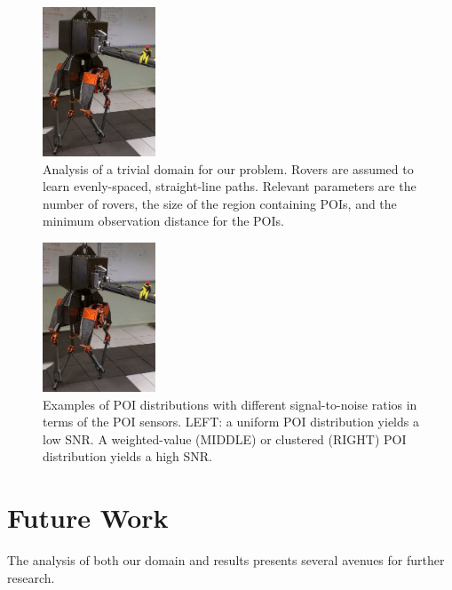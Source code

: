 \documentclass[letterpaper, 10 pt, conference]{ieeeconf}  %
\begin{document}
\begin{figure}[h!]
    \centering
    \includegraphics[width=0.3\textwidth]{ATRIAS.jpg}
    \caption{Analysis of a trivial domain for our problem. Rovers are assumed to learn evenly-spaced, straight-line paths. Relevant parameters are the number of rovers, the size of the region containing POIs, and the minimum observation distance for the POIs. }
    \label{fig:triviality}
\end{figure}

\begin{figure}[h!]
    \centering
    \includegraphics[width=0.3\textwidth]{ATRIAS.jpg}
    \caption{Examples of POI distributions with different signal-to-noise ratios in terms of the POI sensors. LEFT: a uniform POI distribution yields a low SNR. A weighted-value (MIDDLE) or clustered (RIGHT) POI distribution yields a high SNR. }
    \label{fig:signal-contrast}
\end{figure}

\section{Future Work}
The analysis of both our domain and results presents several avenues for further research.
\end{document}
